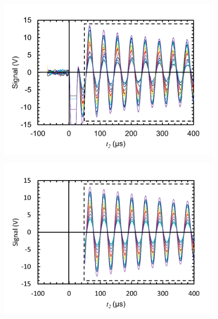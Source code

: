 \documentclass[11pt,dvipdfmx,a4paper]{jsarticle}
\begin{document}
\begin{figure}[H]
	\centering
	\begin{minipage}[t]{0.48\columnwidth}
		\centering
		\includegraphics[width=\columnwidth]{graph/relaxation_water_ex.png}
		\label{graph:water_ex}
	\end{minipage}
	\hfill
	\begin{minipage}[t]{0.48\columnwidth}
		\centering
		\includegraphics[width=\columnwidth]{graph/relaxation_water_fit.png}
		\label{graph:water_fit}
	\end{minipage}\\
	\begin{minipage}[t]{0.48\columnwidth}
		\centering

\end{minipage}
\end{figure}
\end{document}
